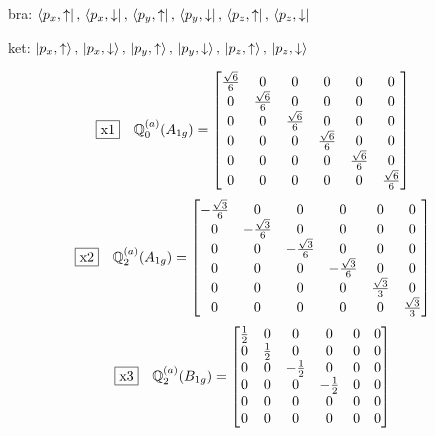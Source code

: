\documentclass[fleqn,10pt,landscape]{jsarticle}
\begin{document}
\vspace{5mm}

\noindent\textbullet\, bra: $\bra{p_{x},\uparrow},\, \bra{p_{x},\downarrow},\, \bra{p_{y},\uparrow},\, \bra{p_{y},\downarrow},\, \bra{p_{z},\uparrow},\, \bra{p_{z},\downarrow}$

\noindent\textbullet\, ket: $\ket{p_{x},\uparrow},\, \ket{p_{x},\downarrow},\, \ket{p_{y},\uparrow},\, \ket{p_{y},\downarrow},\, \ket{p_{z},\uparrow},\, \ket{p_{z},\downarrow}$

\begin{dmath*}
\fbox{x1}\quad \mathbb{Q}_{0}^{(a)}(A_{1g})=\begin{bmatrix} \frac{\sqrt{6}}{6} & 0 & 0 & 0 & 0 & 0 \\ 0 & \frac{\sqrt{6}}{6} & 0 & 0 & 0 & 0 \\ 0 & 0 & \frac{\sqrt{6}}{6} & 0 & 0 & 0 \\ 0 & 0 & 0 & \frac{\sqrt{6}}{6} & 0 & 0 \\ 0 & 0 & 0 & 0 & \frac{\sqrt{6}}{6} & 0 \\ 0 & 0 & 0 & 0 & 0 & \frac{\sqrt{6}}{6} \end{bmatrix}
\end{dmath*}
\begin{dmath*}
\fbox{x2}\quad \mathbb{Q}_{2}^{(a)}(A_{1g})=\begin{bmatrix} - \frac{\sqrt{3}}{6} & 0 & 0 & 0 & 0 & 0 \\ 0 & - \frac{\sqrt{3}}{6} & 0 & 0 & 0 & 0 \\ 0 & 0 & - \frac{\sqrt{3}}{6} & 0 & 0 & 0 \\ 0 & 0 & 0 & - \frac{\sqrt{3}}{6} & 0 & 0 \\ 0 & 0 & 0 & 0 & \frac{\sqrt{3}}{3} & 0 \\ 0 & 0 & 0 & 0 & 0 & \frac{\sqrt{3}}{3} \end{bmatrix}
\end{dmath*}
\begin{dmath*}
\fbox{x3}\quad \mathbb{Q}_{2}^{(a)}(B_{1g})=\begin{bmatrix} \frac{1}{2} & 0 & 0 & 0 & 0 & 0 \\ 0 & \frac{1}{2} & 0 & 0 & 0 & 0 \\ 0 & 0 & - \frac{1}{2} & 0 & 0 & 0 \\ 0 & 0 & 0 & - \frac{1}{2} & 0 & 0 \\ 0 & 0 & 0 & 0 & 0 & 0 \\ 0 & 0 & 0 & 0 & 0 & 0 \end{bmatrix}
\end{dmath*}
\end{document}
